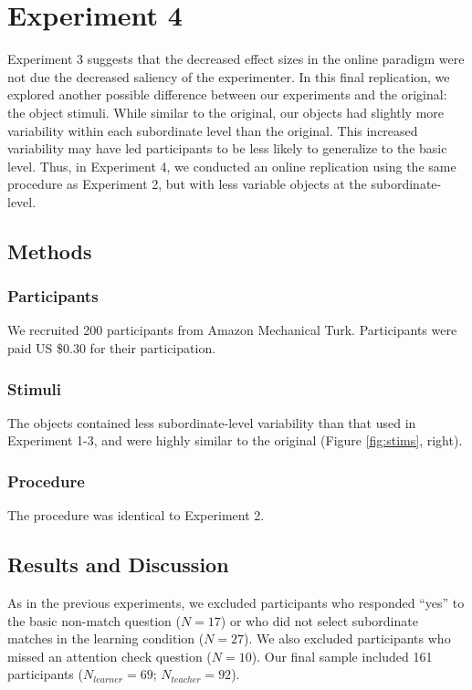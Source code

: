 \documentclass[man]{apa2}
\begin{document}
\section{Experiment 4}
Experiment 3 suggests that the decreased effect sizes in the online paradigm were not due the decreased saliency of the experimenter. In this final replication, we explored another possible difference between our experiments and the original: the object stimuli. While similar to the original, our objects had slightly more variability within each subordinate level than the original. This increased variability may have led participants to be less likely to generalize to the basic level. Thus, in Experiment 4, we conducted an online replication using the same procedure as Experiment 2, but with less variable objects at the subordinate-level. 

\subsection{Methods}

\subsubsection{Participants}  We recruited 200 participants from Amazon Mechanical Turk. Participants were paid US \$0.30 for their participation.

\subsubsection{Stimuli}
The objects contained less subordinate-level variability than that used in Experiment 1-3, and were highly similar to the original (Figure \ref{fig:stims}, right).

\subsubsection{Procedure}
The procedure was identical to Experiment 2.

\subsection{Results and Discussion}

As in the previous experiments, we excluded participants who responded ``yes'' to the basic non-match question ($N=17$) or who did not select subordinate matches in the learning condition ($N = 27$). We also excluded participants who missed an attention check question ($N = 10$). Our final sample included 161 participants ($N_{learner} = 69$; $N_{teacher} = 92$).
\end{document}
